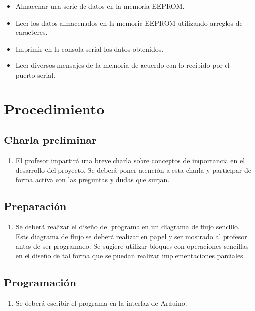 \documentclass[12pt,letterpaper]{IEEEtran}
\begin{document}
\begin{itemize}
	\item Almacenar una serie de datos en la memoria EEPROM.
	\item Leer los datos almacenados en la memoria EEPROM utilizando arreglos de caracteres.
	\item Imprimir en la consola serial los datos obtenidos.
	\item Leer diversos mensajes de la memoria de acuerdo con lo recibido por el puerto serial.
\end{itemize}

\section{Procedimiento}

\subsection{Charla preliminar}

\begin{enumerate}
	\item El profesor impartirá una breve charla sobre conceptos de importancia en el desarrollo del proyecto. Se deberá poner atención a esta charla y participar de forma activa con las preguntas y dudas que surjan.
\end{enumerate}


\subsection{Preparación}

\begin{enumerate}[resume]
	\item Se deberá realizar el diseño del programa en un diagrama de flujo sencillo. Este diagrama de flujo se deberá realizar en papel y ser mostrado al profesor antes de ser programado. Se sugiere utilizar bloques con operaciones sencillas en el diseño de tal forma que se puedan realizar implementaciones parciales.
\end{enumerate}


\subsection{Programación}

\begin{enumerate}[resume]
	\item Se deberá escribir el programa en la interfaz de Arduino.
\end{enumerate}
\end{document}
